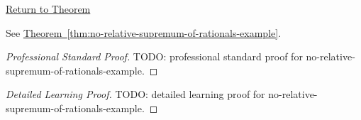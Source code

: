 \newpage
{}
\label{prf:no-relative-supremum-of-rationals-example}

\begin{remark*}[Return]
\hyperref[thm:no-relative-supremum-of-rationals-example]{Return to Theorem}
\end{remark*}

\begin{theorem*}
See \hyperref[thm:no-relative-supremum-of-rationals-example]{Theorem~\ref*{thm:no-relative-supremum-of-rationals-example}}.
\end{theorem*}

\begin{proof}[Professional Standard Proof]
\LRAProofBodyStart
TODO: professional standard proof for no-relative-supremum-of-rationals-example.
\end{proof}

\begin{proof}[Detailed Learning Proof]
\LRAProofBodyStart
TODO: detailed learning proof for no-relative-supremum-of-rationals-example.
\end{proof}

\begin{remark*}
\end{remark*}

\begin{dependencies}
\NoLocalDependencies
\end{dependencies}

\clearpage
